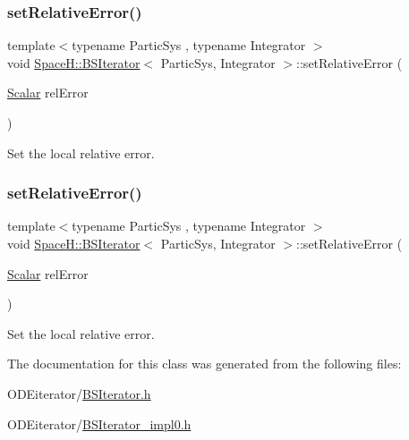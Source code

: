 \subsubsection{\texorpdfstring{set\+Relative\+Error()}{setRelativeError()}\hspace{0.1cm}{\footnotesize\ttfamily [1/2]}}
{\footnotesize\ttfamily template$<$typename Partic\+Sys , typename Integrator $>$ \\
void \mbox{\hyperlink{class_space_h_1_1_b_s_iterator}{Space\+H\+::\+B\+S\+Iterator}}$<$ Partic\+Sys, Integrator $>$\+::set\+Relative\+Error (\begin{DoxyParamCaption}\item[{\mbox{\hyperlink{class_space_h_1_1_b_s_iterator_a89993409583b3022709bdfd84ea8149d}{Scalar}}}]{rel\+Error }\end{DoxyParamCaption})\hspace{0.3cm}{\ttfamily [inline]}}



Set the local relative error. 

\mbox{\label{class_space_h_1_1_b_s_iterator_a8ac161c12bba12277bb9c881b692f60a}} 
\subsubsection{\texorpdfstring{set\+Relative\+Error()}{setRelativeError()}\hspace{0.1cm}{\footnotesize\ttfamily [2/2]}}
{\footnotesize\ttfamily template$<$typename Partic\+Sys , typename Integrator $>$ \\
void \mbox{\hyperlink{class_space_h_1_1_b_s_iterator}{Space\+H\+::\+B\+S\+Iterator}}$<$ Partic\+Sys, Integrator $>$\+::set\+Relative\+Error (\begin{DoxyParamCaption}\item[{\mbox{\hyperlink{class_space_h_1_1_b_s_iterator_a89993409583b3022709bdfd84ea8149d}{Scalar}}}]{rel\+Error }\end{DoxyParamCaption})\hspace{0.3cm}{\ttfamily [inline]}}



Set the local relative error. 



The documentation for this class was generated from the following files\+:\begin{DoxyCompactItemize}
\item 
O\+D\+Eiterator/\mbox{\hyperlink{_b_s_iterator_8h}{B\+S\+Iterator.\+h}}\item 
O\+D\+Eiterator/\mbox{\hyperlink{_b_s_iterator__impl0_8h}{B\+S\+Iterator\+\_\+impl0.\+h}}\end{DoxyCompactItemize}
